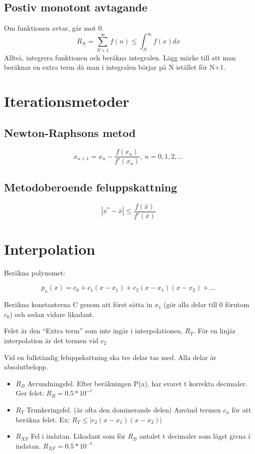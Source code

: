 \documentclass[12pt,a4paper]{article}
\begin{document}
\subsection{Postiv monotont avtagande}
Om funktionen avtar, går mot 0.
$$ R_N = \sum_{N+1}^{\infty} f(n) \leq \int_{N}^{\infty} f(x) dx $$
Alltså, integrera funktionen och beräkna integralen.
Lägg märke till att man beräknar en extra term då man i integralen börjar på N istället för N+1.

\section{Iterationsmetoder}
\subsection{Newton-Raphsons metod}
$$ x_{n+1} = x_n - \frac{f(x_n)}{f'(x_n)}, \: n = 0,1,2,\ldots $$

\subsection{Metodoberoende feluppskattning}
$$ |x^{*}-\bar{x}| \leq \frac{f(\bar{x})}{f'(\bar{x})} $$


\section{Interpolation}

Beräkna polynomet:

$$ p_n(x) = c_0 + c_1(x-x_1) + c_2 (x-x_1)(x-x_2) + \ldots $$

Beräkna konstanterna C genom att först sätta in $x_1$ (gör alla delar till 0 förutom $c_0$) och sedan vidare likadant.

Felet är den ``Extra term'' som inte ingår i interpolationen, $R_T$.
 För en linjär interpolation är det termen vid $c_2$

Vid en fullständig feluppskattning ska tre delar tas med.
Alla delar är absolutbelopp.

\begin{itemize}
\item{$R_B$ Avrundningsfel.
Efter beräkningen P(a), har svaret t korrekta decimaler. \\Ger felet: $ R_B = 0.5 * 10^{-t}$}
\item{$R_T$ Trunkeringsfel.
(är ofta den dominerande delen)
Använd termen $c_n$ för att beräkna felet.
Ex: $ R_T \leq |c_2 (x-x_1)(x-x_2)|$
}
\item{$R_{XF}$ Fel i indatan.
Likadant som för $R_B$ antalet t decimaler som lägst givna i indatan.
$R_{XF} = 0.5 * 10^{-t}$}
\end{itemize}
\end{document}
